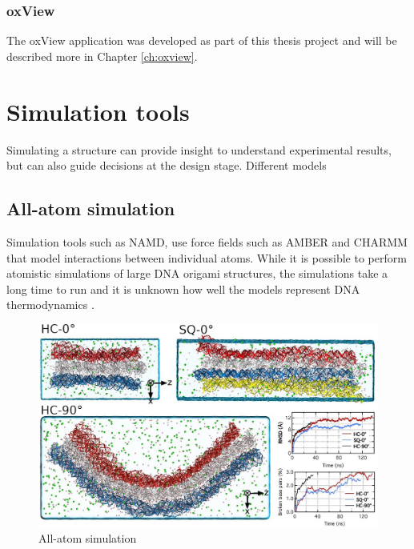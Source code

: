 \subsubsection{oxView}
The oxView application was developed as part of this thesis project and will be described more in Chapter \ref{ch:oxview}.

\section{Simulation tools}
Simulating a structure can provide insight to understand experimental results, but can also guide decisions at the design stage. Different models

\subsection{All-atom simulation}
Simulation tools such as NAMD\cite{NAMDphillips2005scalable}, use force fields such as AMBER\cite{AMBERcornell1996second} and CHARMM \cite{brooks1983charmm} that model interactions between individual atoms. While it is possible to perform atomistic simulations of large DNA origami structures\cite{yoo2013situ}, the simulations take a long time to run and it is unknown how well the models represent DNA thermodynamics \cite{sengar2021primer}.


\begin{figure}[h]
  \begin{center}
    \includegraphics[width=\textwidth]{figures/all-atom.jpg}
    \caption{All-atom simulation}
    \label{fig:all-atom}
  \end{center}
\end{figure}

